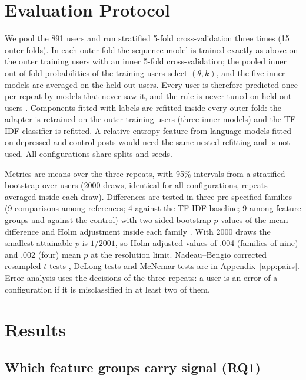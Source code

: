 \documentclass[11pt]{article}
\begin{document}
\section{Evaluation Protocol}

We pool the 891 users and run stratified 5-fold cross-validation three times (15 outer folds).
In each outer fold the sequence model is trained exactly as above on the outer training users with an inner 5-fold cross-validation; the pooled inner out-of-fold probabilities of the training users select $(\theta,k)$, and the five inner models are averaged on the held-out users.
Every user is therefore predicted once per repeat by models that never saw it, and the rule is never tuned on held-out users \citep{cawley2010overfitting}.
Components fitted with labels are refitted inside every outer fold: the adapter is retrained on the outer training users (three inner models) and the TF-IDF classifier is refitted.
A relative-entropy feature from language models fitted on depressed and control posts would need the same nested refitting and is not used.
All configurations share splits and seeds.

Metrics are means over the three repeats, with 95\% intervals from a stratified bootstrap over users (2000 draws, identical for all configurations, repeats averaged inside each draw).
Differences are tested in three pre-specified families (9 comparisons among references; 4 against the TF-IDF baseline; 9 among feature groups and against the control) with two-sided bootstrap $p$-values of the mean difference and Holm adjustment inside each family \citep{holm1979simple}.
With 2000 draws the smallest attainable $p$ is $1/2001$, so Holm-adjusted values of .004 (families of nine) and .002 (four) mean $p$ at the resolution limit.
Nadeau--Bengio corrected resampled $t$-tests \citep{nadeau2003inference}, DeLong tests \citep{delong1988comparing} and McNemar tests \citep{mcnemar1947note} are in Appendix~\ref{app:pairs}.
Error analysis uses the decisions of the three repeats: a user is an error of a configuration if it is misclassified in at least two of them.

\section{Results}

\subsection{Which feature groups carry signal (RQ1)}
\end{document}
